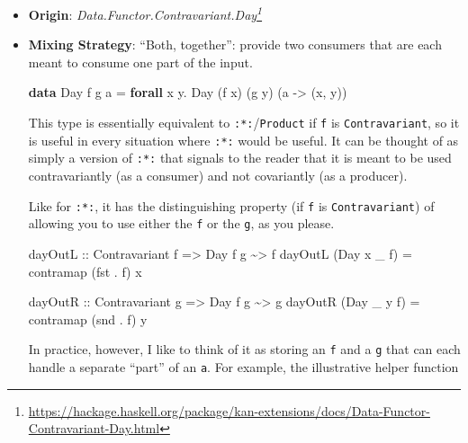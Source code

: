 \documentclass[]{article}
\newenvironment{Shaded}{}{}
\newcommand{\DataTypeTok}[1]{\textcolor[rgb]{0.56,0.13,0.00}{#1}}
\newcommand{\FunctionTok}[1]{\textcolor[rgb]{0.02,0.16,0.49}{#1}}
\newcommand{\KeywordTok}[1]{\textcolor[rgb]{0.00,0.44,0.13}{\textbf{#1}}}
\newcommand{\NormalTok}[1]{#1}
\newcommand{\OperatorTok}[1]{\textcolor[rgb]{0.40,0.40,0.40}{#1}}
\newcommand{\OtherTok}[1]{\textcolor[rgb]{0.00,0.44,0.13}{#1}}
\renewcommand{\href}[2]{#2\footnote{\url{#1}}}
\begin{document}
\begin{itemize}
\item
  \textbf{Origin}:
  \emph{\href{https://hackage.haskell.org/package/kan-extensions/docs/Data-Functor-Contravariant-Day.html}{Data.Functor.Contravariant.Day}}
\item
  \textbf{Mixing Strategy}: ``Both, together'': provide two consumers that are
  each meant to consume one part of the input.

\begin{Shaded}
\begin{Highlighting}[]
\KeywordTok{data} \DataTypeTok{Day}\NormalTok{ f g a }\OtherTok{=} \KeywordTok{forall}\NormalTok{ x y}\OperatorTok{.} \DataTypeTok{Day}\NormalTok{ (f x) (g y) (a }\OtherTok{{-}>}\NormalTok{ (x, y))}
\end{Highlighting}
\end{Shaded}

  This type is essentially equivalent to \texttt{:*:}/\texttt{Product} if
  \texttt{f} is \texttt{Contravariant}, so it is useful in every situation where
  \texttt{:*:} would be useful. It can be thought of as simply a version of
  \texttt{:*:} that signals to the reader that it is meant to be used
  contravariantly (as a consumer) and not covariantly (as a producer).

  Like for \texttt{:*:}, it has the distinguishing property (if \texttt{f} is
  \texttt{Contravariant}) of allowing you to use either the \texttt{f} or the
  \texttt{g}, as you please.

\begin{Shaded}
\begin{Highlighting}[]
\OtherTok{dayOutL ::} \DataTypeTok{Contravariant}\NormalTok{ f }\OtherTok{=>} \DataTypeTok{Day}\NormalTok{ f g }\OperatorTok{\textasciitilde{}>}\NormalTok{ f}
\NormalTok{dayOutL (}\DataTypeTok{Day}\NormalTok{ x \_ f) }\OtherTok{=}\NormalTok{ contramap (}\FunctionTok{fst} \OperatorTok{.}\NormalTok{ f) x}

\OtherTok{dayOutR ::} \DataTypeTok{Contravariant}\NormalTok{ g }\OtherTok{=>} \DataTypeTok{Day}\NormalTok{ f g }\OperatorTok{\textasciitilde{}>}\NormalTok{ g}
\NormalTok{dayOutR (}\DataTypeTok{Day}\NormalTok{ \_ y f) }\OtherTok{=}\NormalTok{ contramap (}\FunctionTok{snd} \OperatorTok{.}\NormalTok{ f) y}
\end{Highlighting}
\end{Shaded}

  In practice, however, I like to think of it as storing an \texttt{f} and a
  \texttt{g} that can each handle a separate ``part'' of an \texttt{a}. For
  example, the illustrative helper function


\end{itemize}
\end{document}
